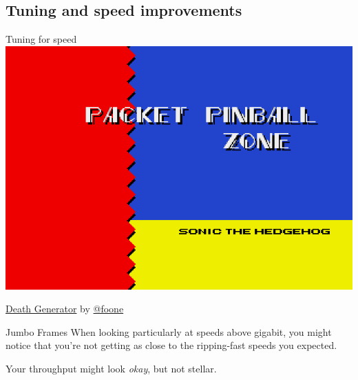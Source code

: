 \documentclass[bigger,aspectratio=169]{beamer}
\begin{document}
\subsection{Tuning and speed improvements}
\label{sec:orgb9c111a}
\begin{frame}{Tuning for speed}
    \centering
    \includegraphics[height=0.75\textheight]{./assets/packet-pinball.png}
    
    \raggedleft
    \small
    \href{http://deathgenerator.com}{Death Generator} by \href{https://twitter.com/foone}{@foone}
\end{frame}

\begin{frame}[label={sec:org13ce3d4}]{Jumbo Frames}
  When looking particularly at speeds above gigabit, you might notice that
  you're not getting as close to the ripping-fast speeds you expected.
  \vspace{3ex}

  Your throughput might look \textit{okay}, but not stellar.
\end{frame}
\end{document}

